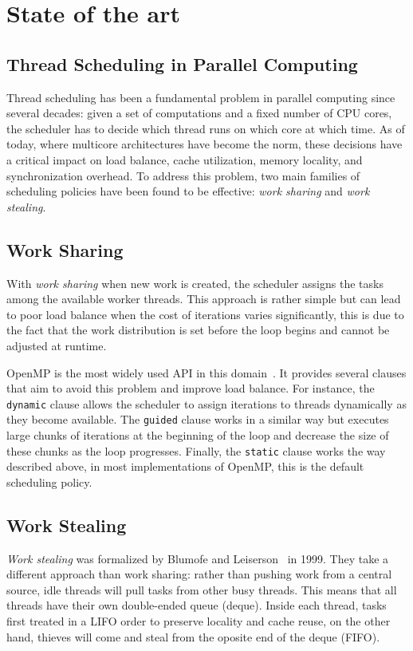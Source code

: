 \documentclass[11pt,english]{article}
\begin{document}
\section{State of the art}
    \subsection{Thread Scheduling in Parallel Computing}

    Thread scheduling has been a fundamental problem in parallel computing since several decades: given a set of computations and a fixed number of CPU cores, the scheduler has to decide which thread runs on which core at which time. As of today, where multicore architectures have become the norm, these decisions have a critical impact on load balance, cache utilization, memory locality, and synchronization overhead. To address this problem, two main families of scheduling policies have been found to be effective: \emph{work sharing} and \emph{work stealing}.

    \subsection{Work Sharing}

    With \emph{work sharing} when new work is created, the scheduler assigns the tasks among the available worker threads. This approach is rather simple but can lead to poor load balance when the cost of iterations varies significantly, this is due to the fact that the work distribution is set before the loop begins and cannot be adjusted at runtime.

    OpenMP is the most widely used API in this domain~\cite{mishra2024cows}. It provides several clauses that aim to avoid this problem and improve load balance. For instance, the \texttt{dynamic} clause allows the scheduler to assign iterations to threads dynamically as they become available. The \texttt{guided} clause works in a similar way but executes large chunks of iterations at the beginning of the loop and decrease the size of these chunks as the loop progresses. Finally, the \texttt{static} clause works the way described above, in most implementations of OpenMP, this is the default scheduling policy.

    \subsection{Work Stealing}

    \emph{Work stealing} was formalized by Blumofe and Leiserson~\cite{blumofe1999workstealing} in 1999. They take a different approach than work sharing: rather than pushing work from a central source, idle threads will pull tasks from other busy threads. This means that all threads have their own double-ended queue (deque). Inside each thread, tasks first treated in a LIFO order to preserve locality and cache reuse, on the other hand, thieves will come and steal from the oposite end of the deque (FIFO).
\end{document}
